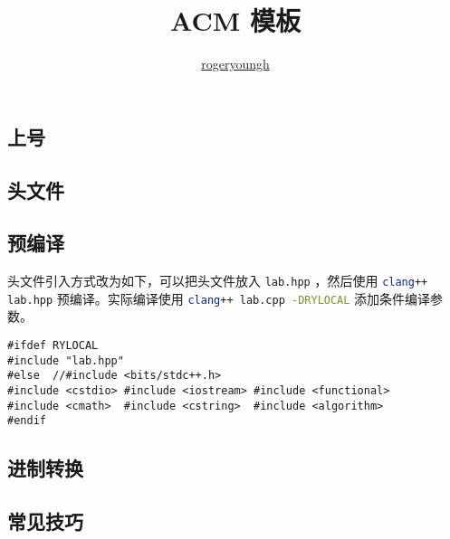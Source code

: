 \documentclass{probook}
\title{ACM 模板}
\author{\href{https://github.com/rogeryoungh}{rogeryoungh}}
\begin{document}
\newcommand\mfrac[2]{\dfrac{#1\smash[b]{\strut}}{#2\smash[t]{\strut}}}
\newcommand\ee{\mathrm{e}}
\newcommand\dd{\mathrm{d}}
\newcommand\uppi{\mathrm{\pi}}

\maketitle

\frontmatter

\columnseprule=2pt
\setlength{\columnsep}{30pt}
\begin{multicols}{2}

\tableofcontents

\mainmatter






\chapter{上号}

\section{头文件}



\section{预编译}

头文件引入方式改为如下，可以把头文件放入 \lstinline[style=cpp]{lab.hpp} ，然后使用 \lstinline[language=bash]{clang++ lab.hpp} 预编译。实际编译使用 \lstinline[language=bash]{clang++ lab.cpp -DRYLOCAL} 添加条件编译参数。

\begin{lstlisting}[style=cpp]
#ifdef RYLOCAL
#include "lab.hpp"
#else  //#include <bits/stdc++.h>
#include <cstdio> #include <iostream> #include <functional>
#include <cmath>  #include <cstring>  #include <algorithm>
#endif
\end{lstlisting}

\section{进制转换}



\section{常见技巧}


\end{multicols}
\end{document}
